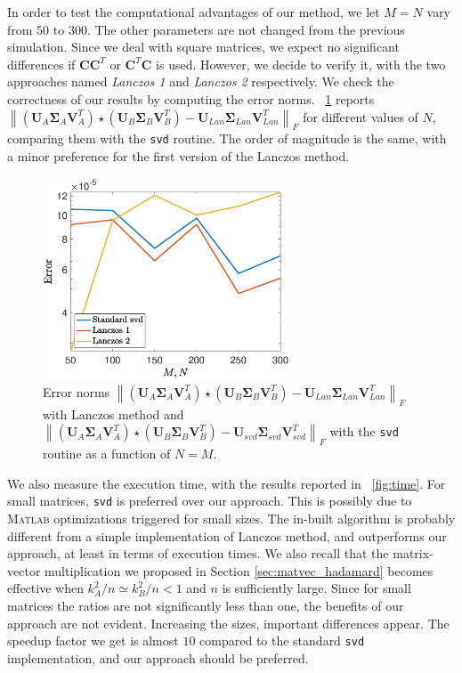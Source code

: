 \documentclass[10pt,titlepage]{article}
\numberwithin{equation}{section}
\numberwithin{figure}{section}
\newcommand{\norm}[1]{\left\lVert#1\right\rVert}
\newcommand{\figref}[1]{\figurename~\ref{#1}}
\begin{document}
In order to test the computational advantages of our method, we let $M=N$ vary from $50$ to $300$. The other parameters are not changed from the previous simulation. Since we deal with square matrices, we expect no significant differences if $\mathbf{C} \mathbf{C}^T$ or $\mathbf{C}^T \mathbf{C}$ is used. However, we decide to verify it, with the two approaches named \textit{Lanczos 1} and \textit{Lanczos 2} respectively.
We check the correctness of our results by computing the error norms. \figref{fig:errors} reports 	$\norm{(\mathbf{U}_A\mathbf{\Sigma}_A\mathbf{V}_A^T)\star(\mathbf{U}_B\mathbf{\Sigma}_B\mathbf{V}_B^T)-\mathbf{U}_{Lan}\mathbf{\Sigma}_{Lan}\mathbf{V}_{Lan}^T}_F$ for different values of $N$, comparing them with the \texttt{svd} routine. The order of magnitude is the same, with a minor preference for the first version of the Lanczos method. 
\begin{figure}[htbp]
	\centering
	\includegraphics[height=6cm]{./error.eps}
	\caption{Error norms $\norm{(\mathbf{U}_A\mathbf{\Sigma}_A\mathbf{V}_A^T)\star(\mathbf{U}_B\mathbf{\Sigma}_B\mathbf{V}_B^T)-\mathbf{U}_{Lan}\mathbf{\Sigma}_{Lan}\mathbf{V}_{Lan}^T}_F$ with Lanczos method and $\norm{(\mathbf{U}_A\mathbf{\Sigma}_A\mathbf{V}_A^T)\star(\mathbf{U}_B\mathbf{\Sigma}_B\mathbf{V}_B^T)-\mathbf{U}_{svd}\mathbf{\Sigma}_{svd}\mathbf{V}_{svd}^T}_F$ with the \texttt{svd} routine as a function of $N=M$.}
	\label{fig:errors}
\end{figure}%
We also measure the execution time, with the results reported in \figref{fig:time}. For small matrices, \texttt{svd} is preferred over our approach. This is possibly due to \textsc{Matlab} optimizations triggered for small sizes. The in-built algorithm is probably different from a simple implementation of Lanczos method, and outperforms our approach, at least in terms of execution times. We also recall that the matrix-vector multiplication we proposed in Section \ref{sec:matvec_hadamard} becomes effective when $k_A^2/n \simeq k_B^2/n<1$ and $n$ is sufficiently large. Since for small matrices the ratios are not significantly less than one, the benefits of our approach are not evident. Increasing the sizes, important differences appear. The speedup factor we get is almost $10$ compared to the standard \texttt{svd} implementation, and our approach should be preferred.
\end{document}
